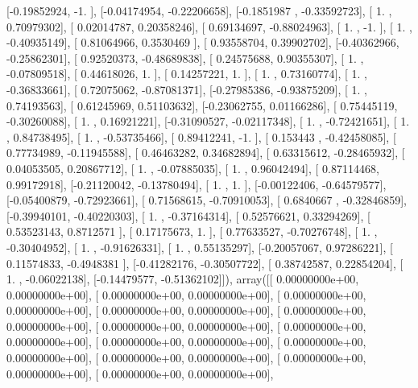 \documentclass{article}
\begin{document}
       [-0.19852924, -1.        ],
       [-0.04174954, -0.22206658],
       [-0.1851987 , -0.33592723],
       [ 1.        ,  0.70979302],
       [ 0.02014787,  0.20358246],
       [ 0.69134697, -0.88024963],
       [ 1.        , -1.        ],
       [ 1.        , -0.40935149],
       [ 0.81064966,  0.3530469 ],
       [ 0.93558704,  0.39902702],
       [-0.40362966, -0.25862301],
       [ 0.92520373, -0.48689838],
       [ 0.24575688,  0.90355307],
       [ 1.        , -0.07809518],
       [ 0.44618026,  1.        ],
       [ 0.14257221,  1.        ],
       [ 1.        ,  0.73160774],
       [ 1.        , -0.36833661],
       [ 0.72075062, -0.87081371],
       [-0.27985386, -0.93875209],
       [ 1.        ,  0.74193563],
       [ 0.61245969,  0.51103632],
       [-0.23062755,  0.01166286],
       [ 0.75445119, -0.30260088],
       [ 1.        ,  0.16921221],
       [-0.31090527, -0.02117348],
       [ 1.        , -0.72421651],
       [ 1.        ,  0.84738495],
       [ 1.        , -0.53735466],
       [ 0.89412241, -1.        ],
       [ 0.153443  , -0.42458085],
       [ 0.77734989, -0.11945588],
       [ 0.46463282,  0.34682894],
       [ 0.63315612, -0.28465932],
       [ 0.04053505,  0.20867712],
       [ 1.        , -0.07885035],
       [ 1.        ,  0.96042494],
       [ 0.87114468,  0.99172918],
       [-0.21120042, -0.13780494],
       [ 1.        ,  1.        ],
       [-0.00122406, -0.64579577],
       [-0.05400879, -0.72923661],
       [ 0.71568615, -0.70910053],
       [ 0.6840667 , -0.32846859],
       [-0.39940101, -0.40220303],
       [ 1.        , -0.37164314],
       [ 0.52576621,  0.33294269],
       [ 0.53523143,  0.8712571 ],
       [ 0.17175673,  1.        ],
       [ 0.77633527, -0.70276748],
       [ 1.        , -0.30404952],
       [ 1.        , -0.91626331],
       [ 1.        ,  0.55135297],
       [-0.20057067,  0.97286221],
       [ 0.11574833, -0.4948381 ],
       [-0.41282176, -0.30507722],
       [ 0.38742587,  0.22854204],
       [ 1.        , -0.06022138],
       [-0.14479577, -0.51362102]]), array([[  0.00000000e+00,   0.00000000e+00],
       [  0.00000000e+00,   0.00000000e+00],
       [  0.00000000e+00,   0.00000000e+00],
       [  0.00000000e+00,   0.00000000e+00],
       [  0.00000000e+00,   0.00000000e+00],
       [  0.00000000e+00,   0.00000000e+00],
       [  0.00000000e+00,   0.00000000e+00],
       [  0.00000000e+00,   0.00000000e+00],
       [  0.00000000e+00,   0.00000000e+00],
       [  0.00000000e+00,   0.00000000e+00],
       [  0.00000000e+00,   0.00000000e+00],
       [  0.00000000e+00,   0.00000000e+00],
\end{document}
